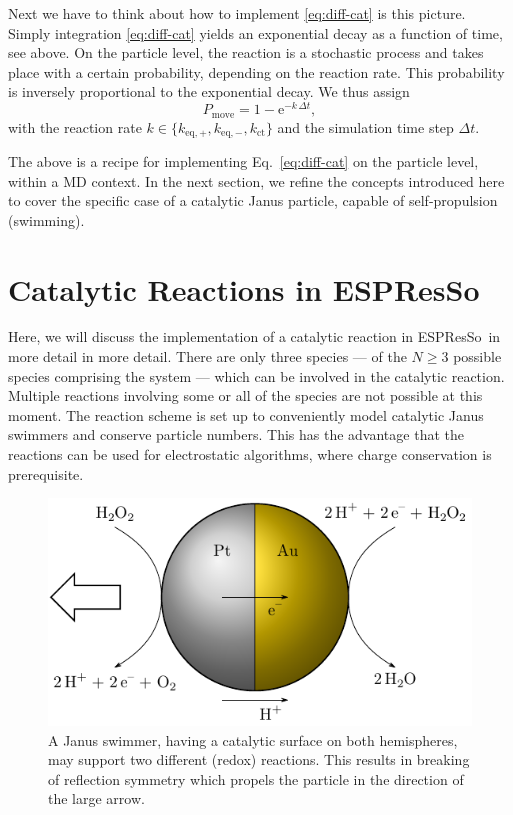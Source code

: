 \documentclass[aip,jcp,reprint,a4paper,onecolumn,nofootinbib,amsmath,amssymb]{revtex4-1}
\newcommand{\es}{\mbox{\textsf{ESPResSo}}\xspace}
\begin{document}
Next we have to think about how to implement \eqref{eq:diff-cat} is this picture. Simply integration \eqref{eq:diff-cat} yields an exponential decay as a function of time, see above. On the particle level, the reaction is a stochastic process and takes place with a certain probability, depending on the reaction rate. This probability is inversely proportional to the exponential decay. We thus assign
\begin{equation}
  \label{eq:prob}
  P_{\text{move}} = 1 - \mathrm{e}^{-k\,\Delta t} ,
\end{equation}
with the reaction rate $k \in \{ k_{\text{eq},+}, k_{\text{eq},-}, k_{\text{ct}} \}$ and the simulation time step $\Delta t$.

The above is a recipe for implementing Eq.~\eqref{eq:diff-cat} on the particle level, within a MD context. In the next section, we refine the concepts introduced here to cover the specific case of a catalytic Janus particle, capable of self-propulsion (swimming).

\section{Catalytic Reactions in \es}

Here, we will discuss the implementation of a catalytic reaction in \es\ in more detail in more detail. There are only three species --- of the $N \ge 3$ possible species comprising the system --- which can be involved in the catalytic reaction. Multiple reactions involving some or all of the species are not possible at this moment. The reaction scheme is set up to conveniently model catalytic Janus swimmers and conserve particle numbers. This has the advantage that the reactions can be used for electrostatic algorithms, where charge conservation is prerequisite. 

\begin{figure}
  \centering
  \includegraphics{FIGURES/janus-particle}
  \caption{\label{fig:janus}A Janus swimmer, having a catalytic surface on both hemispheres, may support two different (redox) reactions. This results in breaking of reflection symmetry which propels the particle in the direction of the large arrow.}
\end{figure}
\end{document}
